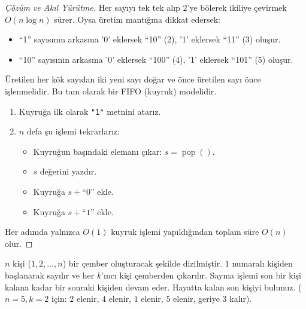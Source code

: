 \begin{proof}[Çözüm ve Akıl Yürütme]
Her sayıyı tek tek alıp $2$'ye bölerek ikiliye çevirmek $O(n \log n)$ sürer. Oysa üretim mantığına dikkat edersek:
\begin{itemize}
    \item ``1'' sayısının arkasına '0' eklersek ``10'' (2), '1' eklersek ``11'' (3) oluşur.
    \item ``10'' sayısının arkasına '0' eklersek ``100'' (4), '1' eklersek ``101'' (5) oluşur.
\end{itemize}
Üretilen her kök sayıdan iki yeni sayı doğar ve önce üretilen sayı önce işlenmelidir. Bu tam olarak bir FIFO (kuyruk) modelidir.

\begin{enumerate}
    \item Kuyruğa ilk olarak \texttt{"1"} metnini atarız.
    \item $n$ defa şu işlemi tekrarlarız:
    \begin{itemize}
        \item Kuyruğun başındaki elemanı çıkar: $s = \operatorname{pop}()$.
        \item $s$ değerini yazdır.
        \item Kuyruğa $s + \text{``0''}$ ekle.
        \item Kuyruğa $s + \text{``1''}$ ekle.
    \end{itemize}
\end{enumerate}
Her adımda yalnızca $O(1)$ kuyruk işlemi yapıldığından toplam süre $O(n)$ olur.
\end{proof}

\begin{example}
$n$ kişi ($1, 2, \dots, n$) bir çember oluşturacak şekilde dizilmiştir. $1$ numaralı kişiden başlanarak sayılır ve her $k$'ıncı kişi çemberden çıkarılır. Sayma işlemi son bir kişi kalana kadar bir sonraki kişiden devam eder. Hayatta kalan son kişiyi bulunuz. ($n = 5, k = 2$ için: $2$ elenir, $4$ elenir, $1$ elenir, $5$ elenir, geriye $3$ kalır).
\end{example}

